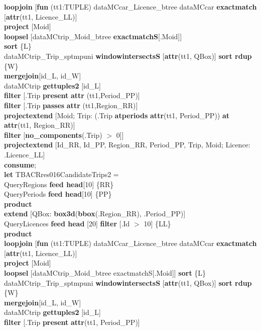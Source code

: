 \documentclass[a4paper]{article}
\newcommand{\op}[1]{\textbf{#1}}
\begin{document}
\begin{scriptsize}
\begin{tabbing}
\>\op{loopjoin} [\op{fun} (tt1:TUPLE) dataMCcar\_Licence\_btree dataMCcar \op{exactmatch} [\op{attr}(tt1, Licence\_LL)]\\
\>\>\op{project} [Moid]\\
\>\>\op{loopsel} [dataMCtrip\_Moid\_btree \op{exactmatchS}[.Moid]]\\
\>\>\op{sort} \{L\}\\
\>\>dataMCtrip\_Trip\_sptmpuni \op{windowintersectsS} [\op{attr}(tt1, QBox)] \op{sort rdup} \{W\}\\
\>\>\op{mergejoin}[id\_L, id\_W]\\
\>\>dataMCtrip \op{gettuples2} [id\_L]\\
\>\>\op{filter} [.Trip \op{present} \op{attr} (tt1,Period\_PP)]\\
\>\>\op{filter} [.Trip \op{passes} \op{attr} (tt1,Region\_RR)]\\
\>\>\op{projectextend} [Moid; Trip: (.Trip \op{atperiods} \op{attr}(tt1, Period\_PP)) \op{at} \op{attr}(tt1, Region\_RR)]\\
\>\>\op{filter} [\op{no\_components}(.Trip) $>$ 0]]\\
\>\op{projectextend} [Id\_RR, Id\_PP, Region\_RR, Period\_PP, Trip, Moid; Licence: .Licence\_LL]\\
\op{consume};\\
\op{let} TBACRres016CandidateTrips2 =\\
\>QueryRegions \op{feed head}[10] \{RR\}\\
\>QueryPeriods \op{feed head}[10] \{PP\}\\
\>\op{product}\\
\>\>\op{extend} [QBox: \op{box3d}(\op{bbox}(.Region\_RR), .Period\_PP)]\\
\>QueryLicences \op{feed head} [20] \op{filter} [.Id $>$ 10] \{LL\}\\
\>\op{product}\\
\>\op{loopjoin} [\op{fun} (tt1:TUPLE) dataMCcar\_Licence\_btree dataMCcar \op{exactmatch} [\op{attr}(tt1, Licence\_LL)]\\
\>\>\op{project} [Moid]\\
\>\>\op{loopsel} [dataMCtrip\_Moid\_btree exactmatchS[.Moid]] \op{sort} \{L\}\\
\>\>dataMCtrip\_Trip\_sptmpuni \op{windowintersectsS} [\op{attr}(tt1, QBox)] \op{sort rdup} \{W\}\\
\>\>\op{mergejoin}[id\_L, id\_W]\\
\>\>dataMCtrip \op{gettuples2} [id\_L]\\
\>\>\op{filter} [.Trip \op{present} \op{attr}(tt1, Period\_PP)]\\

\end{tabbing}
\end{scriptsize}
\end{document}
